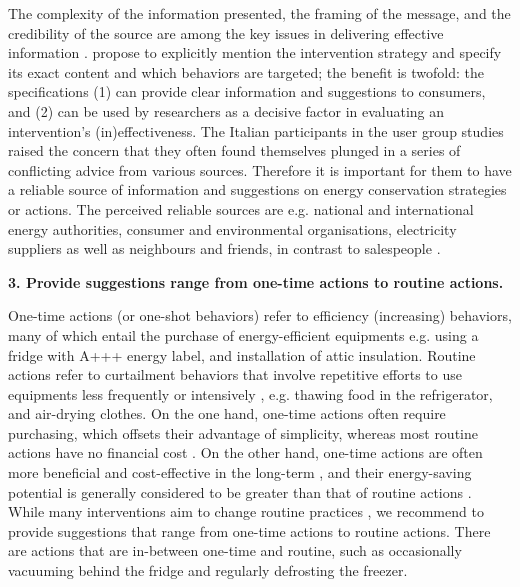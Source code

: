 The complexity of the information presented, the framing of the message, and the credibility of the source are among the key issues in delivering effective information  \citep{Schultz2002}. 
 \citep{Abrahamse2005} propose to explicitly mention the intervention strategy and specify its exact content and which behaviors are targeted; the benefit is twofold: the specifications (1) can provide clear information and suggestions to consumers, and (2) can be used by researchers as a decisive factor in evaluating an intervention's (in)effectiveness. The Italian participants in the user group studies raised the concern that they often found themselves plunged in a series of conflicting advice from various sources. Therefore it is important for them to have a reliable source of information and suggestions on energy conservation strategies or actions. The perceived reliable sources are e.g. national and international energy authorities, consumer and environmental organisations, electricity suppliers  \citep{CEER2015} as well as neighbours and friends, in contrast to salespeople  \citep{Selvefors2015}.

\vspace{.3cm}
\noindent\textbf{3. Provide suggestions range from one-time actions to routine actions.}

One-time actions (or one-shot behaviors) refer to efficiency (increasing) behaviors, many of which entail the purchase of energy-efficient equipments  \citep{Abrahamse2005,Gardner2008} e.g. using a fridge with A+++ energy label, and installation of attic insulation. Routine actions refer to curtailment behaviors that involve repetitive efforts to use equipments less frequently or intensively  \citep{Abrahamse2005,Gardner2008}, e.g. thawing food in the refrigerator, and air-drying clothes. On the one hand, one-time actions often require purchasing, which offsets their advantage of simplicity, whereas most routine actions have no financial cost  \citep{Abrahamse2005,Gardner2008}. On the other hand, one-time actions are often more beneficial and cost-effective in the long-term  \citep{Froehlich2009}, and their energy-saving potential is generally considered to be greater than that of routine actions  \citep{Abrahamse2005,Gardner2008}. While many interventions aim to change routine practices  \citep{Froehlich2009}, we recommend to provide suggestions that range from one-time actions to routine actions. There are actions that are in-between one-time and routine, such as occasionally vacuuming behind the fridge and regularly defrosting the freezer.

